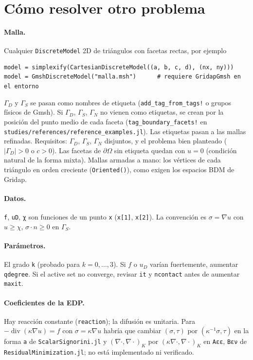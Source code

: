 \documentclass[11pt,a4paper]{article}
\newcommand{\code}[1]{\texttt{#1}}
\newcommand{\dive}{\operatorname{div}}
\begin{document}
\section{Cómo resolver otro problema}

\paragraph{Malla.} Cualquier \code{DiscreteModel} 2D de triángulos con facetas rectas, por
ejemplo
\begin{Verbatim}
model = simplexify(CartesianDiscreteModel((a, b, c, d), (nx, ny)))
model = GmshDiscreteModel("malla.msh")      # requiere GridapGmsh en el entorno
\end{Verbatim}
$\Gamma_D$ y $\Gamma_S$ se pasan como nombres de etiqueta (\code{add\_tag\_from\_tags!} o grupos
físicos de Gmsh). Si $\Gamma_D$, $\Gamma_S$, $\Gamma_N$ no vienen como etiquetas, se crean
por la posición del punto medio de cada faceta (\code{tag\_boundary\_facets!} en
\code{studies/references/reference\_examples.jl}). Las etiquetas pasan a las mallas refinadas.
Requisitos: $\Gamma_D$, $\Gamma_S$, $\Gamma_N$ disjuntos, y el problema bien planteado
($|\Gamma_D|>0$ o $c>0$). Las facetas de $\partial\Omega$ sin etiqueta quedan con $u=0$
(condición natural de la forma mixta). Mallas armadas a mano: los vértices de cada triángulo en
orden creciente (\code{Oriented()}), como exigen los espacios BDM de Gridap.

\paragraph{Datos.} \code{f}, \code{uD}, \code{χ} son funciones de un punto \code{x}
(\code{x[1]}, \code{x[2]}). La convención es $\sigma=\nabla u$ con $u\ge\chi$, $\sigma\cdot n\ge0$
en $\Gamma_S$.

\paragraph{Parámetros.} El grado \code{k} (probado para $k=0,\dots,3$). Si $f$ o $u_D$ varían
fuertemente, aumentar \code{qdegree}. Si el active set no converge, revisar \code{it} y
\code{ncontact} antes de aumentar \code{maxit}.

\paragraph{Coeficientes de la EDP.} Hay reacción constante (\code{reaction}); la difusión es
unitaria. Para $-\dive(\kappa\nabla u)=f$ con $\sigma=\kappa\nabla u$ habría que cambiar
$(\sigma,\tau)$ por $(\kappa^{-1}\sigma,\tau)$ en la forma \code{a} de \code{ScalarSignorini.jl}
y $(\nabla\cdot,\nabla\cdot)_K$ por $(\kappa\nabla\cdot,\nabla\cdot)_K$ en \code{Aεε},
\code{Bεν} de \code{ResidualMinimization.jl}; no está implementado ni verificado.
\end{document}
